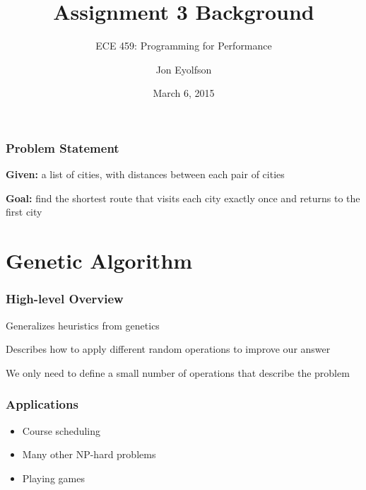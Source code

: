 \documentclass[aspectratio=169,10pt,compress]{beamer}
\title{Assignment 3 Background}
\subtitle{ECE 459: Programming for Performance}
\author{Jon Eyolfson}
\institute{University of Waterloo}
\date{March 6, 2015}
\begin{document}
\maketitle


\begin{frame}
  \frametitle{Problem Statement}

  {\bf Given:} a list of cities, with distances between each pair of cities

  \vspace{2em}

  {\bf Goal:} find the shortest route that visits each city exactly once and
  returns to the first city
\end{frame}

\section{Genetic Algorithm}

\begin{frame}
  \frametitle{High-level Overview}

  Generalizes heuristics from genetics

  \vspace{2em}

  Describes how to apply different random operations to improve our answer

  \vspace{2em}

  We only need to define a small number of operations that describe the problem
\end{frame}

\begin{frame}
  \frametitle{Applications}

  \begin{itemize}
    \item Course scheduling
    \item Many other NP-hard problems
    \item Playing games
  \end{itemize}
\end{frame}
\end{document}
